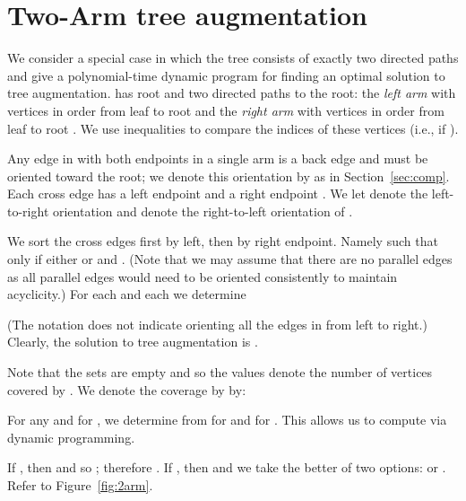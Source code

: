 \documentclass{article}
\begin{document}
\section{Two-Arm {\sc tree augmentation}}
\label{sec:twoarm}
We consider a special case in which the tree  consists of
exactly two directed paths and give a polynomial-time dynamic program
for finding an optimal solution to {\sc tree augmentation}.  
has root  and two directed paths to the root: the {\em
  left arm} with vertices in order from leaf to root  and the {\em right arm}
with vertices in order from leaf to root .  We use inequalities to compare the indices of
these vertices (i.e.,  if ).

Any edge in  with both endpoints in a single
arm is a back edge and must be oriented toward the root; we denote
this orientation by  as in Section~\ref{sec:comp}.  Each cross
edge  has a left endpoint  and a right
endpoint .  We let  denote the
left-to-right orientation and  denote the
right-to-left orientation of .

We sort the cross edges first by left, then by right endpoint.  Namely
 such that  only if either
 or  and .  (Note that we may assume that there are no parallel edges as
all parallel edges would need to be oriented consistently to maintain
acyclicity.)  For each  and each  we determine
\vspace{-5mm}

(The notation  does not indicate orienting all the edges in
 from left to right.)  
Clearly, the solution to {\sc tree augmentation} is .

Note that the sets  are empty and so the values 
denote the number of vertices covered by .  We denote the
coverage by  by:

For any  and for , we determine  from
 for  and  for .  This
allows us to compute  via dynamic programming.

If , then  and so ; therefore .  If , then  and we take the better of two options:
 or .  
Refer to Figure~\ref{fig:2arm}.
\end{document}
